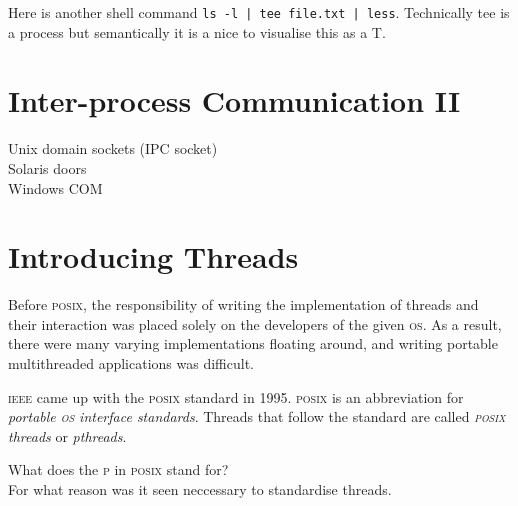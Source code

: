 \begin{example}
Here is another shell command \lstinline{ls -l | tee file.txt | less}.
Technically tee is a process but semantically it is a nice to
visualise this as a T. 
\end{example}



\section{Inter-process Communication II}

Unix domain sockets (IPC socket) \\
Solaris doors \\
Windows COM \\


\section{Introducing Threads}



Before \textsc{posix}, the responsibility of writing the
implementation of threads and their interaction was placed 
solely on the developers of the given \textsc{os}. 
As a result, there were many varying implementations floating around, 
and writing portable multithreaded applications was difficult.

\textsc{ieee} came up with the \textsc{posix} standard in 1995. 
\textsc{posix} is an abbreviation for 
\textit{portable \textsc{os} interface standards}.
Threads that follow the standard are called 
\textit{\textsc{posix} threads} or \textit{pthreads}.

\begin{example}
What does the \textsc{p} in \textsc{posix} stand for? \\
For what reason was it seen neccessary to standardise threads.
\end{example}